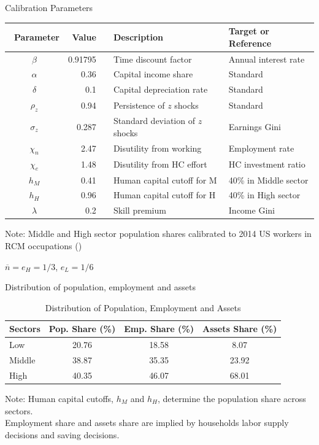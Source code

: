 \documentclass[serif, aspectratio=169]{beamer}
\theoremstyle{remark}
\theoremstyle{plain}
\begin{document}
\begin{frame}{Calibration Parameters}
\begin{table}
\begin{center}
\begin{tabular}{crrll}
\toprule 
\hline~Parameter & Value &  & Description & Target or Reference\tabularnewline
\midrule
$\beta$ & 0.91795 &  & Time discount factor & Annual interest rate\tabularnewline
$\alpha$ & 0.36 &  & Capital income share & Standard \tabularnewline
$\delta$ & 0.1 &  & Capital depreciation rate & Standard \tabularnewline
$\rho_{z}$ & 0.94 &  & Persistence of $z$ shocks & Standard \tabularnewline
$\sigma_{z}$ & 0.287 &  & Standard deviation of $z$ shocks & Earnings Gini\tabularnewline
$\chi_{n}$ & 2.47 &  & Disutility from working & Employment rate\tabularnewline
$\chi_{e}$ & 1.48 &  & Disutility from HC effort & HC investment ratio\tabularnewline
$h_{M}$ & 0.41 &  & Human capital cutoff for M & 40\% in Middle sector\tabularnewline
$h_{H}$ & 0.96 &  & Human capital cutoff for H & 40\% in High sector\tabularnewline
$\lambda$ & 0.2 &  & Skill premium & Income Gini\tabularnewline

\bottomrule
\end{tabular}
\par\end{center}
{\scriptsize Note: Middle and High sector population shares calibrated to 2014 US workers in RCM occupations (\cite{cortes_disappearing_2017}}){\scriptsize\par}
\end{table}
\centering
$\overline{n}=e_H=1/3$, $e_L=1/6$
    
\end{frame}

\begin{frame}{Distribution of population, employment and assets}
\begin{table}[htbp]
\begin{centering}
\caption{Distribution of Population, Employment and Assets}
\begin{tabular}{lccc}
\toprule 
Sectors  & \multicolumn{1}{l}{Pop. Share (\%)} & \multicolumn{1}{l}{Emp. Share (\%)} & \multicolumn{1}{l}{Assets Share (\%)}\tabularnewline
\midrule 
Low  & 20.76 & 18.58 & 8.07\tabularnewline
Middle  & 38.87 & 35.35 & 23.92\tabularnewline
High  & 40.35 & 46.07 & 68.01\tabularnewline
\bottomrule
\end{tabular}\label{tab:SSdistribution}
\par\end{centering}
{\scriptsize Note: Human capital cutoffs, $h_{M}$ and $h_{H}$, determine
the population share across sectors. \\
Employment share and assets share
are implied by households labor supply decisions and saving decisions. }{\scriptsize\par}
\end{table}

    
\end{frame}
\end{document}
